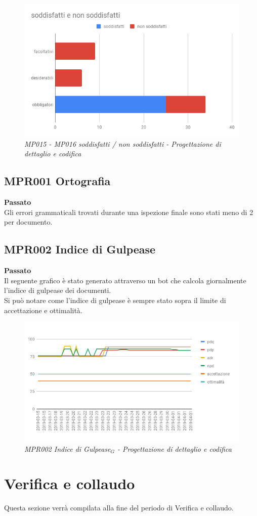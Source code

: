\begin{figure} [H]
    \centering
	\includegraphics[scale=0.5]{./images/barsodPDC.png}
    \caption{\textit{MP015 - MP016 soddisfatti / non soddisfatti - Progettazione di dettaglio e codifica}}
\end{figure}

\subsection{MPR001 Ortografia}
\textbf{Passato}\\
Gli errori grammaticali trovati durante una ispezione finale sono stati meno di 2 per documento.
\subsection{MPR002 Indice di Gulpease}
\textbf{Passato}\\
Il seguente grafico è stato generato attraverso un bot che calcola giornalmente l'indice di gulpease dei documenti.\\
Si può notare come l'indice di gulpease è sempre stato sopra il limite di accettazione e ottimalità.\\
\begin{figure} [H]
    \centering
	\includegraphics[scale=0.5]{./images/gulpeasePDC.png}
    \caption{\textit{MPR002 \textit{Indice di Gulpease$_{G}$} - Progettazione di dettaglio e codifica}}
\end{figure}


\section{Verifica e collaudo}
Questa sezione verrà compilata alla fine del periodo di Verifica e collaudo.